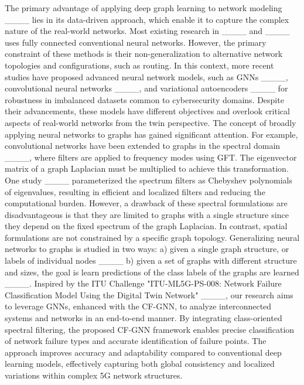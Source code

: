 The primary advantage of applying deep graph learning to network modeling ____ lies in its data-driven approach, which enable it to capture the complex nature of the real-world networks. Most existing research in ____ and ____ uses fully connected conventional neural networks. However, the primary constraint of these methods is their non-generalization to alternative network topologies and configurations, such as routing. In this context, more recent studies have proposed advanced neural network models, such as GNNs ____, convolutional neural networks ____, and variational autoencoders ____ for robustness in imbalanced datasets common to cybersecurity domains. Despite their advancements, these models have different objectives and overlook critical aspects of real-world networks from the twin perspective. The concept of broadly applying neural networks to graphs has gained significant attention. For example, convolutional networks have been extended to graphs in the spectral domain ____, where filters are applied to frequency modes using GFT. The eigenvector matrix of a graph Laplacian must be multiplied to achieve this transformation. One study ____ parameterized the spectrum filters as Chebyshev polynomials of eigenvalues, resulting in efficient and localized filters and reducing the computational burden. However, a drawback of these spectral formulations are disadvantageous is that they are limited to graphs with a single structure since they depend on the fixed spectrum of the graph Laplacian. In contrast, spatial formulations are not constrained by a specific graph topology. Generalizing neural networks to graphs is studied in two ways: a) given a single graph structure, or labels of individual nodes ____ b) given a set of graphs with different structure and sizes, the goal is learn predictions of the class labels of the graphs are learned ____.  Inspired by the ITU Challenge "ITU-ML5G-PS-008: Network Failure Classification Model Using the Digital Twin Network" ____, our research aims to leverage GNNs, enhanced with the CF-GNN, to analyze interconnected systems and networks in an end-to-end manner. By integrating class-oriented spectral filtering, the proposed CF-GNN framework enables precise classification of network failure types and accurate identification of failure points. The approach improves accuracy and adaptability compared to conventional deep learning models, effectively capturing both global consistency and localized variations within complex 5G network structures.

